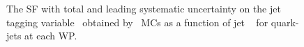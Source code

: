 \begin{figure}[htbp]
	\caption[]{
		The SF with total and leading systematic uncertainty on the jet tagging variable \ntrk~obtained by ~MCs as a function of jet \pt~%
		for quark-jets at each WP.
		\label{fig:QG-pythia-Unc_Ntrk21c1}
	}
\end{figure}


